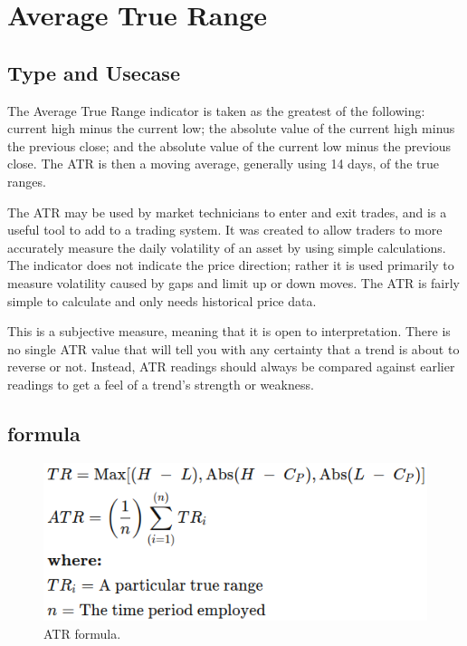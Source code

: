 \documentclass[12pt,a4paper]{article}
\begin{document}
\section{Average True Range}

\subsection{Type and Usecase}
The Average True Range indicator is taken as the greatest of the following: current high minus the current low; the absolute value of the current high minus the previous close; and the absolute value of the current low minus the previous close. The ATR is then a moving average, generally using 14 days, of the true ranges.

The ATR may be used by market technicians to enter and exit trades, and is a useful tool to add to a trading system. It was created to allow traders to more accurately measure the daily volatility of an asset by using simple calculations. The indicator does not indicate the price direction; rather it is used primarily to measure volatility caused by gaps and limit up or down moves. The ATR is fairly simple to calculate and only needs historical price data.

This is a subjective measure, meaning that it is open to interpretation. There is no single ATR value that will tell you with any certainty that a trend is about to reverse or not. Instead, ATR readings should always be compared against earlier readings to get a feel of a trend's strength or weakness.

\subsection{formula}

\begin{figure}[H]
    \includegraphics[scale=0.7]{../images/ATR.png}
    \caption{ATR formula.}
    \label{fig:ATR}
\end{figure}
\end{document}
